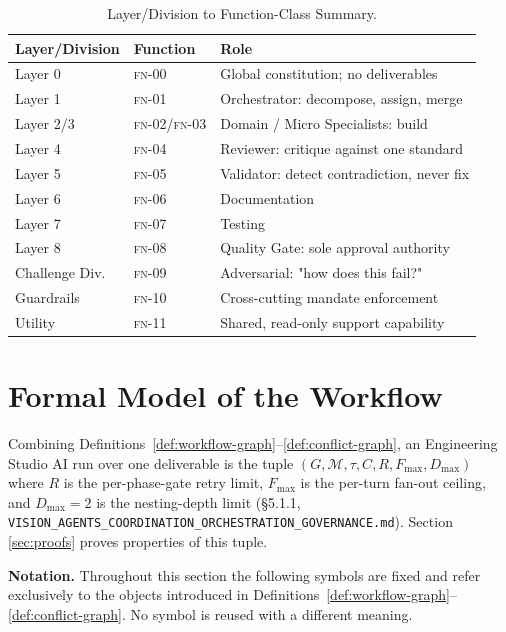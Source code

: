 \documentclass[12pt]{article}
\theoremstyle{definition}
\newcommand{\code}[1]{\texttt{#1}}
\newcommand{\FN}[1]{\textsc{fn-#1}}
\newcommand{\VisionGov}{\code{VISION\_AGENTS\_\allowbreak COORDINATION\_\allowbreak ORCHESTRATION\_\allowbreak GOVERNANCE.md}}
\begin{document}
\begin{table}[H]
\centering
\caption{Layer/Division to Function-Class Summary.}
\label{tab:layers}
\begin{tabular}{@{}llp{6.5cm}@{}}
\toprule
\textbf{Layer/Division} & \textbf{Function} & \textbf{Role} \\
\midrule
Layer 0 & \FN{00} & Global constitution; no deliverables \\
Layer 1 & \FN{01} & Orchestrator: decompose, assign, merge \\
Layer 2/3 & \FN{02}/\FN{03} & Domain / Micro Specialists: build \\
Layer 4 & \FN{04} & Reviewer: critique against one standard \\
Layer 5 & \FN{05} & Validator: detect contradiction, never fix \\
Layer 6 & \FN{06} & Documentation \\
Layer 7 & \FN{07} & Testing \\
Layer 8 & \FN{08} & Quality Gate: sole approval authority \\
Challenge Div. & \FN{09} & Adversarial: "how does this fail?" \\
Guardrails & \FN{10} & Cross-cutting mandate enforcement \\
Utility & \FN{11} & Shared, read-only support capability \\
\bottomrule
\end{tabular}
\end{table}

\section{Formal Model of the Workflow}
\label{sec:model}

Combining Definitions~\ref{def:workflow-graph}--\ref{def:conflict-graph}, an
Engineering Studio AI run over one deliverable is the tuple
$(G, \mathcal{M}, \tau, C, R, F_{\max}, D_{\max})$ where $R$ is the
per-phase-gate retry limit, $F_{\max}$ is the per-turn fan-out ceiling, and
$D_{\max} = 2$ is the nesting-depth limit (\S5.1.1,
\VisionGov{}). Section
\ref{sec:proofs} proves properties of this tuple.


\medskip
\noindent\textbf{Notation.}
Throughout this section the following symbols are fixed and refer
exclusively to the objects introduced in
Definitions~\ref{def:workflow-graph}--\ref{def:conflict-graph}.
No symbol is reused with a different meaning.
\end{document}
